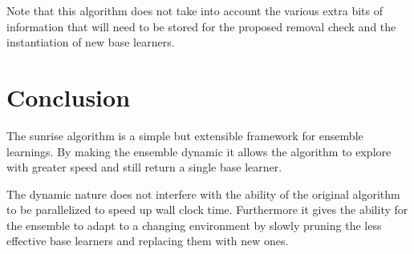 \documentclass[12pt]{article}
\begin{document}
Note that this algorithm does not take into account the various extra bits of information that will need to be stored for the proposed removal check and the instantiation of new base learners.

\section{Conclusion}

The sunrise algorithm is a simple but extensible framework for ensemble learnings. By making the ensemble dynamic it allows the algorithm to explore with greater speed and still return a single base learner.

The dynamic nature does not interfere with the ability of the original algorithm to be parallelized to speed up wall clock time. Furthermore it gives the ability for the ensemble to adapt to a changing environment by slowly pruning the less effective base learners and replacing them with new ones.
\end{document}

